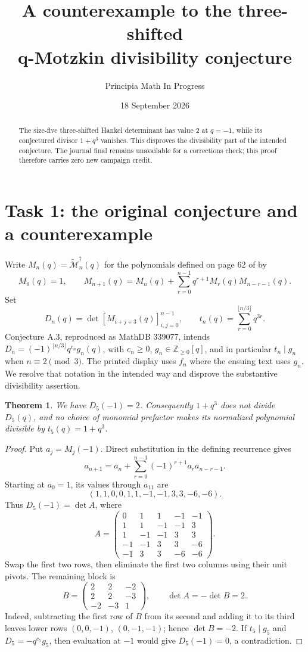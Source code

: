 \documentclass[10pt]{article}
\title{A counterexample to the three-shifted\\q-Motzkin divisibility conjecture}
\author{Principia Math In Progress}
\date{18 September 2026}
\newtheorem{theorem}{Theorem}
\begin{document}
\maketitle
\begin{abstract}
The size-five three-shifted Hankel determinant has value \(2\) at
\(q=-1\), while its conjectured divisor \(1+q^3\) vanishes.
This disproves the divisibility part of the intended conjecture.
The journal final remains unavailable for a corrections check;
this proof therefore carries zero new campaign credit.
\end{abstract}

\section*{Task 1: the original conjecture and a counterexample}
Write \(M_n(q)=\widetilde{\mathcal M}^{\dagger}_n(q)\) for the polynomials
defined on page 62 of \cite{OS} by
\[
 M_0(q)=1,\qquad
 M_{n+1}(q)=M_n(q)+\sum_{r=0}^{n-1}q^{r+1}M_r(q)M_{n-r-1}(q).
\]
Set
\[
 D_n(q)=\det[M_{i+j+3}(q)]_{i,j=0}^{n-1},
 \qquad t_n(q)=\sum_{r=0}^{\lfloor n/3\rfloor}q^{3r}.
\]
Conjecture A.3, reproduced as MathDB 339077, intends
\(D_n=(-1)^{\lfloor n/3\rfloor}q^{c_n}g_n(q)\), with
\(c_n\geq0\), \(g_n\in\mathbb Z_{\geq0}[q]\), and in particular
\(t_n\mid g_n\) when \(n\equiv2\pmod3\).
The printed display uses \(f_n\) where the ensuing text uses \(g_n\).
We resolve that notation in the intended way and disprove the
substantive divisibility assertion.

\begin{theorem}
We have \(D_5(-1)=2\). Consequently \(1+q^3\) does not divide \(D_5(q)\),
and no choice of monomial prefactor makes its normalized polynomial
divisible by \(t_5(q)=1+q^3\).
\end{theorem}
\begin{proof}
Put \(a_j=M_j(-1)\). Direct substitution in the defining recurrence gives
\[
 a_{n+1}=a_n+\sum_{r=0}^{n-1}(-1)^{r+1}a_ra_{n-r-1}.
\]
Starting at \(a_0=1\), its values through \(a_{11}\) are
\[
 (1,1,0,0,1,1,-1,-1,3,3,-6,-6).
\]
Thus \(D_5(-1)=\det A\), where
\[
 A=\begin{pmatrix}
 0&1&1&-1&-1\\
 1&1&-1&-1&3\\
 1&-1&-1&3&3\\
 -1&-1&3&3&-6\\
 -1&3&3&-6&-6
 \end{pmatrix}.
\]
Swap the first two rows, then eliminate the first two columns using
their unit pivots. The remaining block is
\[
 B=\begin{pmatrix}2&2&-2\\2&2&-3\\-2&-3&1\end{pmatrix},
 \qquad \det A=-\det B=2.
\]
Indeed, subtracting the first row of \(B\) from its second and adding
it to its third leaves lower rows \((0,0,-1)\), \((0,-1,-1)\);
hence \(\det B=-2\).
If \(t_5\mid g_5\) and \(D_5=-q^{c_5}g_5\), then evaluation at
\(-1\) would give \(D_5(-1)=0\), a contradiction.
\end{proof}
\end{document}
